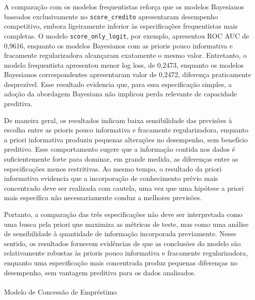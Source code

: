 \documentclass[
  brazilian,
  12pt,
  letterpaper,
  DIV=11,
  numbers=noendperiod]{scrartcl}
\makeatletter
\let\oldparagraph\paragraph
\renewcommand{\paragraph}{
    \@ifstar
      \xxxParagraphStar
      \xxxParagraphNoStar
  }
\newcommand{\xxxParagraphStar}[1]{\oldparagraph*{#1}\mbox{}}
\newcommand{\xxxParagraphNoStar}[1]{\oldparagraph{#1}\mbox{}}
\makeatother
\begin{document}
A comparação com os modelos frequentistas reforça que os modelos
Bayesianos baseados exclusivamente no \texttt{score\_credito}
apresentaram desempenho competitivo, embora ligeiramente inferior às
especificações frequentistas mais completas. O modelo
\texttt{score\_only\_logit}, por exemplo, apresentou ROC AUC de 0,9616,
enquanto os modelos Bayesianos com as prioris pouco informativa e
fracamente regularizadora alcançaram exatamente o mesmo valor.
Entretanto, o modelo frequentista apresentou menor log loss, de 0,2473,
enquanto os modelos Bayesianos correspondentes apresentaram valor de
0,2472, diferença praticamente desprezível. Esse resultado evidencia
que, para essa especificação simples, a adoção da abordagem Bayesiana
não implicou perda relevante de capacidade preditiva.

De maneira geral, os resultados indicam baixa sensibilidade das
previsões à escolha entre as prioris pouco informativa e fracamente
regularizadora, enquanto a priori informativa produziu pequenas
alterações no desempenho, sem benefício preditivo. Esse comportamento
sugere que a informação contida nos dados é suficientemente forte para
dominar, em grande medida, as diferenças entre as especificações menos
restritivas. Ao mesmo tempo, o resultado da priori informativa evidencia
que a incorporação de conhecimento prévio mais concentrado deve ser
realizada com cautela, uma vez que uma hipótese a priori mais específica
não necessariamente conduz a melhores previsões.

Portanto, a comparação das três especificações não deve ser interpretada
como uma busca pela priori que maximiza as métricas de teste, mas como
uma análise de sensibilidade à quantidade de informação incorporada
previamente. Nesse sentido, os resultados fornecem evidências de que as
conclusões do modelo são relativamente robustas às prioris pouco
informativa e fracamente regularizadora, enquanto uma especificação mais
concentrada produz pequenas diferenças no desempenho, sem vantagem
preditiva para os dados analisados.

\paragraph{Modelo de Concessão de
Empréstimo}\label{modelo-de-concessuxe3o-de-empruxe9stimo-1}
\end{document}
